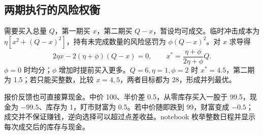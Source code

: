\subsection{两期执行的风险权衡}

需要买入总量 $Q$，第一期买 $x$，第二期买 $Q-x$，暂设均可成交。临时冲击成本为 $\eta[x^2+(Q-x)^2]$，持有未完成数量的风险惩罚为 $\phi(Q-x)^2$。对 $x$ 求导得
\[
 2\eta x-2(\eta+\phi)(Q-x)=0,
 \qquad x^*=\frac{\eta+\phi}{2\eta+\phi}Q.
\]
$\phi=0$ 时均分；$\phi$ 增加时提前买入更多。$Q=6,\eta=1,\phi=2$ 时 $x^*=4.5$，第二期为 1.5；若只能买整数，比较 $x=4,5$，两者目标都为 28，形成并列最优。

报价反馈也可直接算现金。中价 100、半价差 0.5，从零库存买入一股于 99.5，现金为 $-99.5$、库存为 1，盯市财富为 0.5。若中价随即跌到 99，财富变成 $-0.5$；成交并不保证赚钱，逆向选择可以超过点差收益。notebook 枚举整数日程并显示每次成交后的库存与现金。
